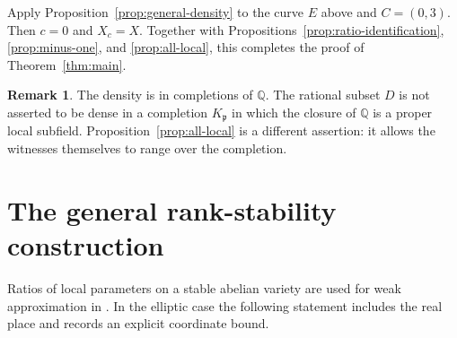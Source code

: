 \documentclass[11pt,a4paper]{article}
\theoremstyle{definition}
\newtheorem{remark}[theorem]{Remark}
\newcommand{\Q}{\mathbb Q}\newcommand{\Z}{\mathbb Z}
\begin{document}
Apply Proposition~\ref{prop:general-density} to the curve $E$ above
and $C=(0,3)$. Then $c=0$ and $X_c=X$. Together with
Propositions~\ref{prop:ratio-identification}, \ref{prop:minus-one},
and \ref{prop:all-local}, this completes the proof of
Theorem~\ref{thm:main}.

\begin{remark}
The density is in completions of $\Q$. The rational subset $D$ is
not asserted to be dense in a completion $K_{\mathfrak p}$ in which
the closure of $\Q$ is a proper local subfield.
Proposition~\ref{prop:all-local} is a different assertion: it allows
the witnesses themselves to range over the completion.
\end{remark}

\section{The general rank-stability construction}

Ratios of local parameters on a stable abelian variety are used for
weak approximation in \cite[Theorem 4.2(b)]{Poonen}. In the elliptic
case the following statement includes the real place and records
an explicit coordinate bound.
\end{document}
